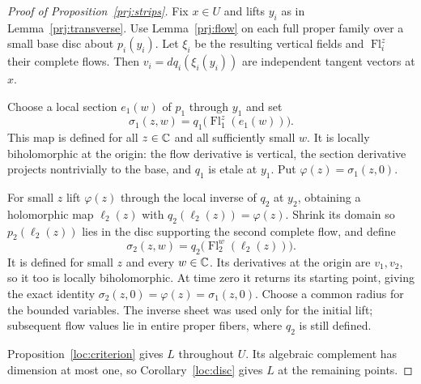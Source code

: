 \begin{proof}[Proof of Proposition~\ref{prj:strips}]
Fix $x\in U$ and lifts $y_i$ as in Lemma~\ref{prj:transverse}.
Use Lemma~\ref{prj:flow} on each full proper family over a
small base disc about $p_i(y_i)$. Let $\xi_i$ be the resulting
vertical fields and $\operatorname{Fl}_i^z$ their complete
flows. Then
$v_i=dq_i(\xi_i(y_i))$ are independent tangent vectors at $x$.

Choose a local section $e_1(w)$ of $p_1$ through $y_1$ and set
\[
\sigma_1(z,w)=q_1\bigl(\operatorname{Fl}_1^z(e_1(w))\bigr).
\]
This map is defined for all $z\in\mathbb C$ and all sufficiently
small $w$. It is locally biholomorphic at the origin:
the flow derivative is vertical, the section derivative
projects nontrivially to the base, and $q_1$ is etale at $y_1$.
Put $\varphi(z)=\sigma_1(z,0)$.

For small $z$ lift $\varphi(z)$ through the local inverse
of $q_2$ at $y_2$, obtaining a holomorphic map $\ell_2(z)$
with $q_2(\ell_2(z))=\varphi(z)$. Shrink its domain so
$p_2(\ell_2(z))$ lies in the disc supporting the second
complete flow, and define
\[
\sigma_2(z,w)=q_2\bigl(\operatorname{Fl}_2^w(\ell_2(z))\bigr).
\]
It is defined for small $z$ and every $w\in\mathbb C$.
Its derivatives at the origin are $v_1,v_2$, so it too
is locally biholomorphic. At time zero it returns its
starting point, giving the exact identity
$\sigma_2(z,0)=\varphi(z)=\sigma_1(z,0)$.
Choose a common radius for the bounded variables.
The inverse sheet was used only for the initial lift;
subsequent flow values lie in entire proper fibers,
where $q_2$ is still defined.

Proposition~\ref{loc:criterion} gives $L$ throughout $U$.
Its algebraic complement has dimension at most one, so
Corollary~\ref{loc:disc} gives $L$ at the remaining points.
\end{proof}

